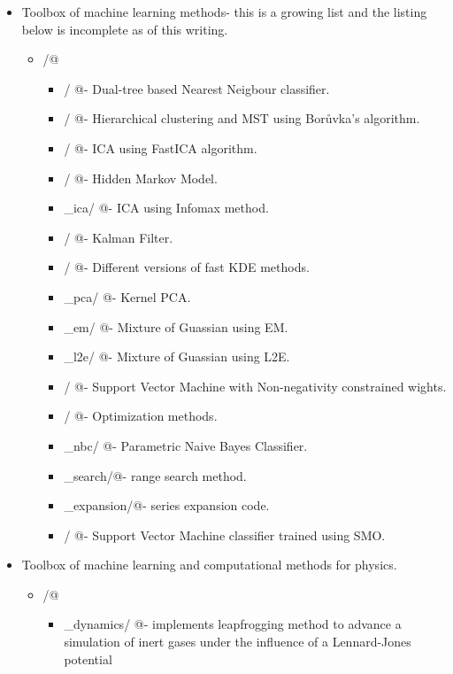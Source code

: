 \documentclass[letter]{report}
\begin{document}
\begin{itemize}
\item Toolbox of machine learning methods- this is a growing list and the listing below is incomplete as of this writing.
  \begin{itemize}
  \item \verb@mlpack/@ 
    \begin{itemize}
    \item \verb@allknn/      @- Dual-tree based Nearest Neigbour classifier.
    \item \verb@emst/        @- Hierarchical clustering and MST using Bor\r{u}vka's algorithm.
    \item \verb@fastica/     @- ICA using FastICA algorithm. 
    \item \verb@hmm/         @- Hidden Markov Model.
    \item \verb@infomax_ica/ @- ICA using Infomax method.
    \item \verb@kalman/      @- Kalman Filter. 
    \item \verb@kde/         @- Different versions of fast KDE methods.
    \item \verb@kernel_pca/  @- Kernel PCA.
    \item \verb@mog_em/      @- Mixture of Guassian using EM.
    \item \verb@mog_l2e/     @- Mixture of Guassian using L2E.
    \item \verb@nnsvm/       @- Support Vector Machine with Non-negativity constrained wights.
    \item \verb@opt/         @- Optimization methods. 
    \item \verb@parm_nbc/    @- Parametric Naive Bayes Classifier.
    \item \verb@range_search/@- range search method.
    \item \verb@series_expansion/@- series expansion code.
    \item \verb@svm/         @- Support Vector Machine classifier trained using SMO.
    \end{itemize}
  \end{itemize}
\item Toolbox of machine learning and computational methods for physics.
  \begin{itemize}
  \item \verb@physpack/@ 
    \begin{itemize}
    \item \verb@mol_dynamics/  @- implements leapfrogging method to advance a simulation of inert gases under the influence of a Lennard-Jones potential

\end{itemize}
\end{itemize}
\end{itemize}
\end{document}
